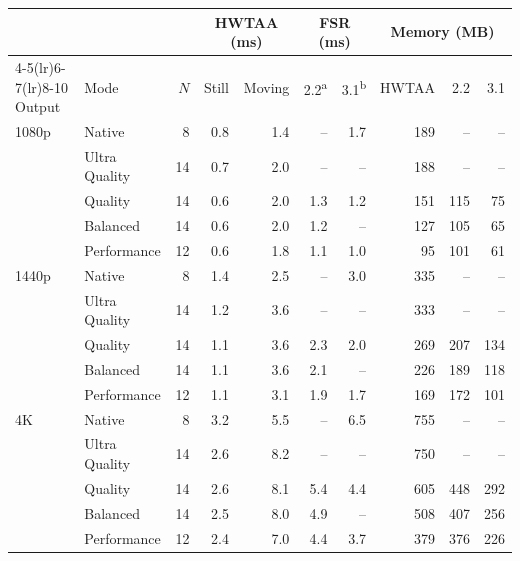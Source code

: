 \begin{tabular}{llrrrrrrrr}
\toprule
 & & & \multicolumn{2}{c}{HWTAA (ms)} & \multicolumn{2}{c}{FSR (ms)} & \multicolumn{3}{c}{Memory (MB)} \\
\cmidrule(lr){4-5}\cmidrule(lr){6-7}\cmidrule(lr){8-10}
Output & Mode & $N$ & Still & Moving & 2.2\textsuperscript{a} & 3.1\textsuperscript{b} & HWTAA & 2.2 & 3.1 \\
\midrule
1080p & Native & 8 & 0.8 & 1.4 & -- & 1.7 & 189 & -- & -- \\
 & Ultra Quality & 14 & 0.7 & 2.0 & -- & -- & 188 & -- & -- \\
 & Quality & 14 & 0.6 & 2.0 & 1.3 & 1.2 & 151 & 115 & 75 \\
 & Balanced & 14 & 0.6 & 2.0 & 1.2 & -- & 127 & 105 & 65 \\
 & Performance & 12 & 0.6 & 1.8 & 1.1 & 1.0 & 95 & 101 & 61 \\
\midrule
1440p & Native & 8 & 1.4 & 2.5 & -- & 3.0 & 335 & -- & -- \\
 & Ultra Quality & 14 & 1.2 & 3.6 & -- & -- & 333 & -- & -- \\
 & Quality & 14 & 1.1 & 3.6 & 2.3 & 2.0 & 269 & 207 & 134 \\
 & Balanced & 14 & 1.1 & 3.6 & 2.1 & -- & 226 & 189 & 118 \\
 & Performance & 12 & 1.1 & 3.1 & 1.9 & 1.7 & 169 & 172 & 101 \\
\midrule
4K & Native & 8 & 3.2 & 5.5 & -- & 6.5 & 755 & -- & -- \\
 & Ultra Quality & 14 & 2.6 & 8.2 & -- & -- & 750 & -- & -- \\
 & Quality & 14 & 2.6 & 8.1 & 5.4 & 4.4 & 605 & 448 & 292 \\
 & Balanced & 14 & 2.5 & 8.0 & 4.9 & -- & 508 & 407 & 256 \\
 & Performance & 12 & 2.4 & 7.0 & 4.4 & 3.7 & 379 & 376 & 226 \\
\bottomrule
\end{tabular}
